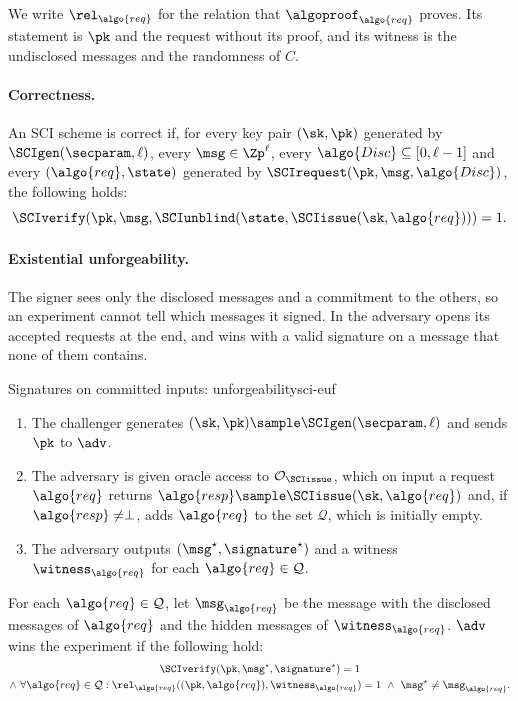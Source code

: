 We write $\rel_{\algo{req}}$ for the relation that $\algoproof_{\algo{req}}$
proves. Its statement is $\pk$ and the request without its proof, and its
witness is the undisclosed messages and the randomness of $C$.

\paragraph{Correctness.} An SCI scheme is correct if, for every key pair $(\sk,
\pk)$ generated by $\SCIgen(\secparam, \ell)$, every $\msg \in \Zp^\ell$, every
$\algo{Disc} \subseteq [0, \ell-1]$ and every $(\algo{req}, \state)$ generated by
$\SCIrequest(\pk, \msg, \algo{Disc})$, the following holds:
%
\begin{equation*}
%
  \SCIverify(\pk, \msg, \SCIunblind(\state, \SCIissue(\sk, \algo{req}))) = 1.
%
\end{equation*}

\paragraph{Existential unforgeability.} The signer sees only the disclosed
messages and a commitment to the others, so an experiment cannot tell which
messages it signed. In  the adversary opens its accepted
requests at the end, and wins with a valid signature on a message that none of
them contains.

\begin{experimentbox}{Signatures on committed inputs: unforgeability}{sci-euf}

  \begin{enumerate}

    \item The challenger generates $(\sk, \pk) \sample \SCIgen(\secparam, \ell)$
and sends $\pk$ to $\adv$.

    \item The adversary is given oracle access to $\mathcal{O}_{\SCIissue}$,
which on input a request $\algo{req}$ returns $\algo{resp} \sample
\SCIissue(\sk, \algo{req})$ and, if $\algo{resp} \neq \perp$, adds $\algo{req}$
to the set $\mathcal{Q}$, which is initially empty.

    \item The adversary outputs $(\msg^\star, \signature^\star)$ and a witness
$\witness_{\algo{req}}$ for each $\algo{req} \in \mathcal{Q}$.

  \end{enumerate}

  For each $\algo{req} \in \mathcal{Q}$, let $\msg_{\algo{req}}$ be the message
with the disclosed messages of $\algo{req}$ and the hidden messages of
$\witness_{\algo{req}}$. $\adv$ wins the experiment if the following hold:
  \begin{multline*}
    \SCIverify(\pk, \msg^\star, \signature^\star) = 1 \\
    \wedge\ \forall \algo{req} \in \mathcal{Q} : \rel_{\algo{req}}((\pk,
\algo{req}), \witness_{\algo{req}}) = 1 \ \wedge\ \msg^\star \neq
\msg_{\algo{req}}.
  \end{multline*}

\end{experimentbox}

